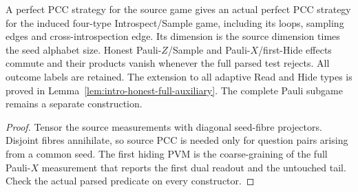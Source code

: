 \begin{lemma}
\label{lem:intro-honest-core}
\leanok
A perfect PCC strategy for the source game gives an actual perfect PCC
strategy for the induced four-type Introspect/Sample game, including its loops,
sampling edges and cross-introspection edge. Its dimension is the source
dimension times the seed alphabet size. Honest Pauli-$Z$/Sample and
Pauli-$X$/first-Hide effects commute and their products vanish whenever the
full parsed test rejects. All outcome labels are retained.
The extension to all adaptive Read and Hide types is proved in
Lemma~\ref{lem:intro-honest-full-auxiliary}. The complete Pauli subgame
remains a separate construction.
\end{lemma}
\begin{proof}
\leanok
Tensor the source measurements with diagonal seed-fibre projectors.
Disjoint fibres annihilate, so source PCC is needed only for question pairs
arising from a common seed. The first hiding PVM is the coarse-graining
of the full Pauli-$X$ measurement that reports the first dual readout and
the untouched tail. Check the actual parsed predicate on every constructor.
\end{proof}

